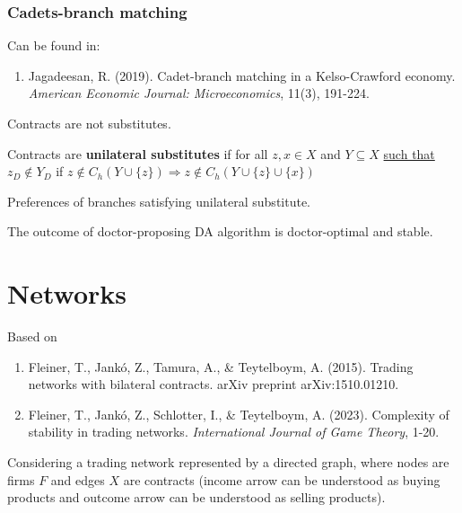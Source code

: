\documentclass[11pt]{elegantbook}
\begin{document}
\subsubsection*{Cadets-branch matching}
Can be found in:
\begin{enumerate}[$\circ$]
    \item Jagadeesan, R. (2019). Cadet-branch matching in a Kelso-Crawford economy. \textit{American Economic Journal: Microeconomics}, 11(3), 191-224.
\end{enumerate}


\begin{remark}
    Contracts are not substitutes.
\end{remark}

\begin{definition}
    \normalfont
    Contracts are \textbf{unilateral substitutes} if for all $z,x\in X$ and $Y\subseteq X$ \underline{such that $z_D\notin Y_D$} if $z\notin C_h(Y\cup\{z\}) \Rightarrow z\notin C_h(Y\cup\{z\}\cup\{x\})$
\end{definition}

\begin{remark}
    Preferences of branches satisfying unilateral substitute.
\end{remark}

\begin{remark}
    The outcome of doctor-proposing DA algorithm is doctor-optimal and stable.
\end{remark}

\section{Networks}
Based on
\begin{enumerate}[$\circ$]
    \item Fleiner, T., Jankó, Z., Tamura, A., \& Teytelboym, A. (2015). Trading networks with bilateral contracts. arXiv preprint arXiv:1510.01210.
    \item Fleiner, T., Jankó, Z., Schlotter, I., \& Teytelboym, A. (2023). Complexity of stability in trading networks. \textit{International Journal of Game Theory}, 1-20.
\end{enumerate}

Considering a trading network represented by a directed graph, where nodes are firms $F$ and edges $X$ are contracts (income arrow can be understood as buying products and outcome arrow can be understood as selling products).
\end{document}
